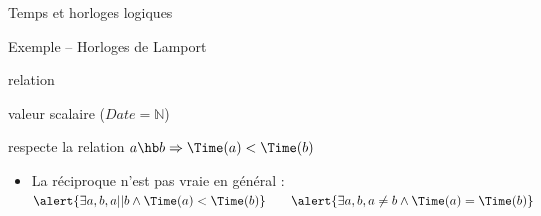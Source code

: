 \begin{frame}{Temps et horloges logiques}
  \vspace{-1mm}
  \begin{alertblock}{Exemple -- Horloges de Lamport}
    \vspace{-2mm}
    \begin{description}[Horloge :]
    \item[Temps :] relation 
    \item[Date :] valeur scalaire (\alert{$\mathit{Date}=\mathbb N$})
    \item[Horloge :] \vspace{-1mm} respecte la relation  \hspace{\fill} \alert{$a \hb b  \Rightarrow \Time(a) < \Time(b)$}
      \begin{itemize}
      \item La réciproque n'est pas vraie en général :\\
        $\alert{\exists a, b, a || b \land \Time(a) < \Time(b)} \quad \quad \alert{\exists a, b, a \neq b \land \Time(a) = \Time(b)}$
      \end{itemize}
    \end{description}

  \end{alertblock}
  
\end{frame}

\endgroup
\endinput
